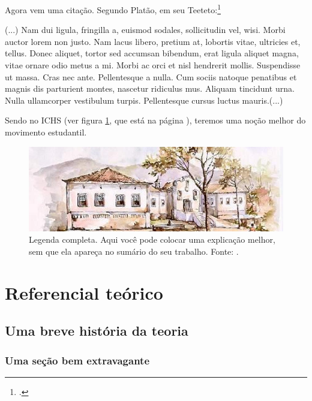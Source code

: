 \documentclass[
	12pt,				%
	openright,			%
	twoside,			%
	a4paper,			%
	english,			%
	brazil				%
	]{abntex2}
\begin{document}
Agora vem uma citação. Segundo Platão, em seu Teeteto:\footcite{platao-teeteto}
\begin{citacao}
	(...) Nam dui ligula, fringilla a, euismod sodales, sollicitudin vel, wisi. Morbi auctor lorem non justo. Nam lacus libero, pretium at, lobortis vitae, ultricies et, tellus. Donec aliquet, tortor sed accumsan bibendum, erat ligula aliquet magna, vitae ornare odio metus a mi. Morbi ac orci et nisl hendrerit mollis. Suspendisse ut massa. Cras nec ante. Pellentesque a nulla. Cum sociis natoque penatibus et magnis dis parturient montes, nascetur ridiculus mus. Aliquam tincidunt urna. Nulla
	ullamcorper vestibulum turpis. Pellentesque cursus luctus mauris.(...)
\end{citacao}

Sendo no ICHS (ver figura \ref{fig:309}, que está na página \pageref{fig:309}), teremos uma noção melhor do movimento estudantil.

\lipsum[30]

\begin{figure}[htbp]
	\centering
	\includegraphics[scale=0.4]{ichs2.jpg} %
	\caption[Legenda reduzida - aparece no sumário]{Legenda completa. Aqui você pode colocar uma explicação melhor, sem que ela apareça no sumário do seu trabalho. Fonte: \cite[p.~117]{boyle1772}.}
	\label{fig:309}
\end{figure}
\part{Referencial teórico}
\chapter{Uma breve história da teoria}

\section{Uma seção bem extravagante}
\end{document}
